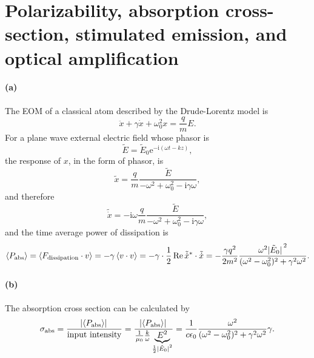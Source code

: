 \documentclass[hyperref, a4paper]{article}
\newcommand*{\ii}{\mathrm{i}}
\newcommand*{\ee}{\mathrm{e}}
\begin{document}

\section{Polarizability, absorption cross-section, stimulated emission, and optical amplification}

\paragraph{(a)} The EOM of a classical atom described by the Drude-Lorentz model is 
\begin{equation}
    \ddot{x} + \gamma \dot{x} + \omega_0^2 x = \frac{q}{m} E.
\end{equation}
For a plane wave external electric field whose phasor is 
\begin{equation}
    \tilde{E} = \tilde{E}_0 \ee^{- \ii (\omega t - k z)},
\end{equation}
the response of $x$, in the form of phasor, is 
\begin{equation}
    \tilde{x} = \frac{q}{m} \frac{\tilde{E}}{- \omega^2 + \omega_0^2 - \ii \gamma \omega},
    \label{eq:x-e-relation}
\end{equation}
and therefore 
\begin{equation}
    \tilde{\dot{x}} = - \ii \omega \frac{q}{m} \frac{\tilde{E}}{- \omega^2 + \omega_0^2 - \ii \gamma \omega},
\end{equation}
and the time average power of dissipation is 
\begin{equation}
    \expval{P_\text{abs}} = \expval{F_\text{dissipation} \cdot v} 
    = - \gamma \expval{v \cdot v} = - \gamma \cdot \frac{1}{2} \Re \tilde{\dot{x}}^* \cdot \tilde{\dot{x}}
    = - \frac{\gamma q^2}{2 m^2} \frac{\omega^2 \abs*{\tilde{E}_0}^2}{
        (\omega^2 - \omega_0^2)^2 + \gamma^2 \omega^2
    }.
\end{equation}

\paragraph{(b)} The absorption cross section can be calculated by 
\begin{equation}
    \sigma_\text{abs} = \frac{\abs*{\expval{P_\text{abs}}}}{\text{input intensity}}
    = \frac{\abs*{\expval{P_\text{abs}}}}{
        \frac{1}{\mu_0} \frac{k}{\omega} \underbrace{
            E^2
        }_{\frac{1}{2} \abs*{\tilde{E}_0}^2}   
    }
    = \frac{1}{c \epsilon_0} \frac{\omega^2}{
        (\omega^2 - \omega_0^2)^2 + \gamma^2 \omega^2
    } \gamma.
\end{equation}
\end{document}
